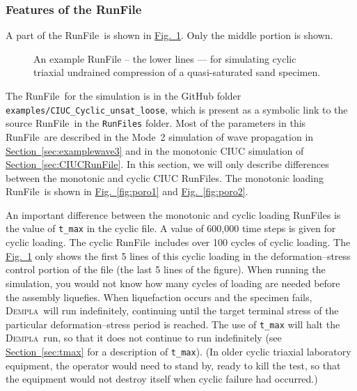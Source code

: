 \documentclass[letterpaper,11pt]{article}
\newcommand{\Dempla}{\textsc{Dempla}}
\newcommand{\RunFile}{\textsf{RunFile}}
\begin{document}
\subsubsection{Features of the \RunFile}
%
A part of the \RunFile\ is shown in
\hyperref[fig:poro3]{Fig.~\ref*{fig:poro3}}.
Only the middle portion is shown.
%
\begin{figure}
\centering\footnotesize

\caption{An example \textsf{RunFile} -- the lower lines --- for simulating cyclic triaxial undrained compression of a quasi-saturated sand specimen.}
\label{fig:poro3}
\end{figure}
%
The \RunFile\ for the simulation
is in the GitHub folder
\texttt{examples/CIUC\_Cyclic\_unsat\_loose},
which is present as a symbolic link to the
source \RunFile\ in the \texttt{RunFiles} folder.
Most of the parameters in this \RunFile\ are
described in the Mode~2 simulation of wave propagation in
\hyperref[sec:examplewave3]{Section~\ref*{sec:examplewave3}}
and in the monotonic CIUC simulation of
\hyperref[sec:CIUCRunFile]{Section~\ref*{sec:CIUCRunFile}}.
In this section, we will only describe differences
between the monotonic and cyclic CIUC \RunFile s.
The monotonic loading \RunFile\ is shown in
\hyperref[fig:poro1]{Fig.~\ref*{fig:poro1}}
and \hyperref[fig:poro2]{Fig.~\ref*{fig:poro2}}.
%
\par
An important difference between the monotonic and cyclic
loading \RunFile s is the value of \texttt{t\_max} in
the cyclic file.
A value of 600,000 time steps is given for cyclic
loading.
The cyclic \RunFile\ includes over 100 cycles of
cyclic loading.
The \hyperref[fig:poro3]{Fig.~\ref*{fig:poro3}} only
shows the first 5 lines of this cyclic loading
in the deformation--stress control portion of 
the file (the last 5 lines of the figure).
When running the simulation, you would not know
how many cycles of loading are needed before the
assembly liquefies.
When liquefaction occurs and the specimen fails,
\Dempla\ will run indefinitely, continuing until the
target terminal stress of the
particular deformation--stress period is reached.
The use of \texttt{t\_max} will halt the \Dempla\ run,
so that it does not continue to run indefinitely
(see \hyperref[sec:tmax]{Section~\ref*{sec:tmax}}
for a description of \texttt{t\_max}).
(In older cyclic triaxial laboratory equipment,
the operator would need to stand by, ready
to kill the test, so that the equipment would not
destroy itself when cyclic failure had occurred.)
%
\par
\end{document}
